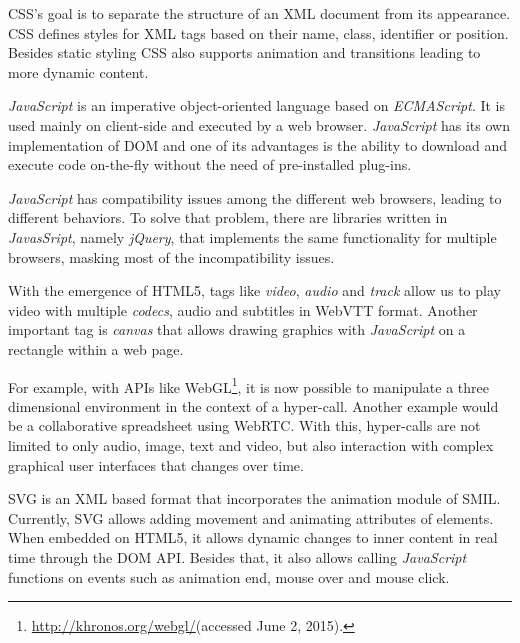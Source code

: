 \documentclass[10pt,conference]{IEEEtran}
\begin{document}
  
  \gls{CSS}'s goal is to separate the structure of an \gls{XML} document from its appearance. \gls{CSS} defines styles for \gls{XML} tags based on their name, class, identifier or position.
  Besides static styling \gls{CSS} also supports animation and transitions leading to more dynamic content.

  \emph{JavaScript} is an imperative object-oriented language based on \emph{ECMAScript}. It is used mainly on client-side and executed by a web browser. \emph{JavaScript} has its own implementation of \gls{DOM} and one of its advantages is the ability to download and execute code on-the-fly without the need of pre-installed plug-ins.

  \emph{JavaScript} has compatibility issues among the different web browsers, leading to different behaviors. To solve that problem, there are libraries written in \emph{JavasSript}, namely \emph{jQuery}, that implements the same functionality for multiple browsers, masking most of the incompatibility issues.

  With the emergence of \gls{HTML}5, tags like \emph{video}, \emph{audio} and \emph{track} allow us to play video with multiple \emph{codecs}, audio and subtitles in \gls{WebVTT} format. Another important tag is \emph{canvas} that allows drawing graphics with \emph{JavaScript} on a rectangle within a web page.

  For example, with \gls{API}s like WebGL\footnote{\url{http://khronos.org/webgl/}(accessed June 2, 2015).}, it is now possible to manipulate a three dimensional environment in the context of a hyper-call. Another example would be a collaborative spreadsheet using \gls{WebRTC}. With this, hyper-calls are not limited to only audio, image, text and video, but also interaction with complex graphical user interfaces that changes over time.


  \gls{SVG} is an \gls{XML} based format that incorporates the animation module of \gls{SMIL}. Currently, \gls{SVG} allows adding movement and animating attributes of elements. When embedded on \gls{HTML}5, it allows dynamic changes to inner content in real time through the \gls{DOM} \gls{API}. Besides that, it also allows calling \emph{JavaScript} functions on events such as animation end, mouse over and mouse click.
  
\end{document}
